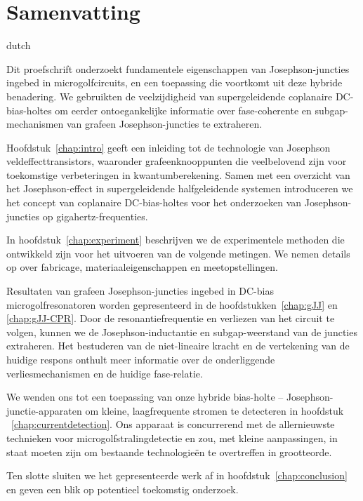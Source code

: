 
\chapter*{Samenvatting}

\begin{otherlanguage*}{dutch}%

Dit proefschrift onderzoekt fundamentele eigenschappen van Josephson-juncties ingebed in microgolfcircuits, en een toepassing die voortkomt uit deze hybride benadering.
%
We gebruikten de veelzijdigheid van supergeleidende coplanaire DC-bias-holtes om eerder ontoegankelijke informatie over fase-coherente en subgap-mechanismen van grafeen Josephson-juncties te extraheren.

\noindent\newline
Hoofdstuk~\ref{chap:intro} geeft een inleiding tot de technologie van Josephson veldeffecttransistors, waaronder grafeenknooppunten die veelbelovend zijn voor toekomstige verbeteringen in kwantumberekening.
%
Samen met een overzicht van het Josephson-effect in supergeleidende halfgeleidende systemen introduceren we het concept van coplanaire DC-bias-holtes voor het onderzoeken van Josephson-juncties op gigahertz-frequenties.

\noindent\newline
In hoofdstuk~\ref{chap:experiment} beschrijven we de experimentele methoden die ontwikkeld zijn voor het uitvoeren van de volgende metingen.
%
We nemen details op over fabricage, materiaaleigenschappen en meetopstellingen.

\noindent\newline
Resultaten van grafeen Josephson-juncties ingebed in DC-bias microgolfresonatoren worden gepresenteerd in de hoofdstukken~\ref{chap:gJJ} en \ref{chap:gJJ-CPR}.
%
Door de resonantiefrequentie en verliezen van het circuit te volgen, kunnen we de Josephson-inductantie en subgap-weerstand van de juncties extraheren.
%
Het bestuderen van de niet-lineaire kracht en de vertekening van de huidige respons onthult meer informatie over de onderliggende verliesmechanismen en de huidige fase-relatie.

\noindent\newline
We wenden ons tot een toepassing van onze hybride bias-holte -- Josephson-junctie-apparaten om kleine, laagfrequente stromen te detecteren in hoofdstuk ~\ref{chap:currentdetection}.
%
Ons apparaat is concurrerend met de allernieuwste technieken voor microgolfstralingdetectie en zou, met kleine aanpassingen, in staat moeten zijn om bestaande technologieën te overtreffen in grootteorde.

\noindent\newline
Ten slotte sluiten we het gepresenteerde werk af in hoofdstuk~\ref{chap:conclusion} en geven een blik op potentieel toekomstig onderzoek.

\end{otherlanguage*}

